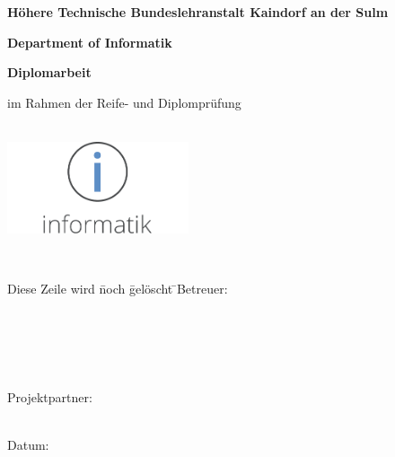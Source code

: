 \begin{titlepage}
	
	{\textbf {Höhere Technische Bundeslehranstalt Kaindorf an der Sulm}\par\vspace{0.3cm}}
	{\textbf {Department of Informatik}\par	\vspace{0.7cm}}
	\Large{\textbf{Diplomarbeit}}\par\vspace{0.2cm}
	\small im Rahmen der Reife- und Diplomprüfung\par
	\vspace{1.5cm}
	\Huge\textbf{\daTitle}\\
	\vspace{1cm}
	\includegraphics[width=0.4\textwidth]{images/inf_farbe_2.pdf}\\
	\vspace{1cm}
	\normalsize \daAuthorOne \par
	\normalsize \daAuthorTwo \par
	\normalsize \daAuthorThree \par
	\vspace{0,5cm}
	\daGrade\\ \daYear
	\vfill
	\begin{flushleft}
	\begin{tabbing}
	Diese Zeile wird \= noch \= gelöscht \=  \kill\vspace{0.2cm}Betreuer:\> \daSupervisorOne\par 
	\\\vspace{0.2cm}\> \daSupervisorTwo \par 
	\\\vspace{0.2cm}\> \daSupervisorThree \par 
	\\\vspace{0.2cm}Projektpartner:\> \daPartner \par
	\\Datum:\> \daDocDate
	\end{tabbing}
	\end{flushleft}
\end{titlepage}